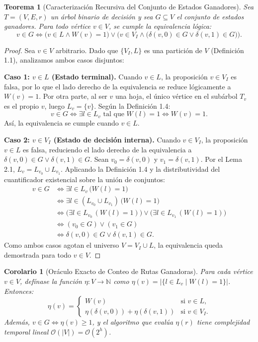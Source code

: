 \documentclass[11pt, a4paper]{article}
\theoremstyle{definition}
\theoremstyle{plain}
\newtheorem{theorem}{Teorema}[section]
\newtheorem{corollary}{Corolario}[section]
\begin{document}
\begin{theorem}[Caracterización Recursiva del Conjunto de Estados Ganadores]
Sea $T = (V, E, r)$ un árbol binario de decisión y sea $G \subseteq V$ el conjunto de estados ganadores. Para todo vértice $v \in V$, se cumple la equivalencia lógica:
\[
    v \in G \iff \big(v \in L \land W(v) = 1\big) \lor \Big(v \in V_I \land \big(\delta(v, 0) \in G \lor \delta(v, 1) \in G\big)\Big).
\]
\end{theorem}

\begin{proof}
Sea $v \in V$ arbitrario. Dado que $\{V_I, L\}$ es una partición de $V$ (Definición 1.1), analizamos ambos casos disjuntos:

\textbf{Caso 1: $v \in L$ (Estado terminal).} Cuando $v \in L$, la proposición $v \in V_I$ es falsa, por lo que el lado derecho de la equivalencia se reduce lógicamente a $W(v) = 1$. Por otra parte, al ser $v$ una hoja, el único vértice en el subárbol $T_v$ es el propio $v$, luego $L_v = \{v\}$. Según la Definición 1.4:
\[
    v \in G \iff \exists l \in L_v \text{ tal que } W(l) = 1 \iff W(v) = 1.
\]
Así, la equivalencia se cumple cuando $v \in L$.

\textbf{Caso 2: $v \in V_I$ (Estado de decisión interna).} Cuando $v \in V_I$, la proposición $v \in L$ es falsa, reduciendo el lado derecho de la equivalencia a $\delta(v, 0) \in G \lor \delta(v, 1) \in G$. Sean $v_0 = \delta(v, 0)$ y $v_1 = \delta(v, 1)$. Por el Lema 2.1, $L_v = L_{v_0} \cup L_{v_1}$. Aplicando la Definición 1.4 y la distributividad del cuantificador existencial sobre la unión de conjuntos:
\begin{align*}
    v \in G &\iff \exists l \in L_v \, \big(W(l) = 1\big) \\
            &\iff \exists l \in (L_{v_0} \cup L_{v_1}) \, \big(W(l) = 1\big) \\
            &\iff \big(\exists l \in L_{v_0} \, (W(l) = 1)\big) \lor \big(\exists l \in L_{v_1} \, (W(l) = 1)\big) \\
            &\iff (v_0 \in G) \lor (v_1 \in G) \\
            &\iff \delta(v, 0) \in G \lor \delta(v, 1) \in G.
\end{align*}
Como ambos casos agotan el universo $V = V_I \cup L$, la equivalencia queda demostrada para todo $v \in V$.
\end{proof}

\begin{corollary}[Oráculo Exacto de Conteo de Rutas Ganadoras]
Para cada vértice $v \in V$, defínase la función $\eta: V \to \mathbb{N}$ como $\eta(v) = |\{l \in L_v \mid W(l) = 1\}|$. Entonces:
\[
    \eta(v) = \begin{cases}
        W(v) & \text{si } v \in L, \\
        \eta(\delta(v, 0)) + \eta(\delta(v, 1)) & \text{si } v \in V_I.
    \end{cases}
\]
Además, $v \in G \iff \eta(v) \geq 1$, y el algoritmo que evalúa $\eta(r)$ tiene complejidad temporal lineal $\mathcal{O}(|V|) = \mathcal{O}(2^h)$.
\end{corollary}
\end{document}
